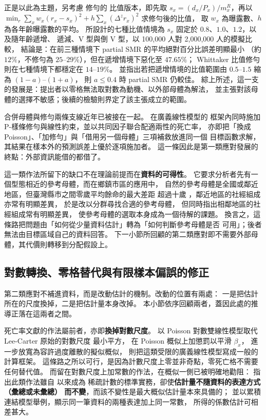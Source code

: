 \documentclass[UTF8, fontset=macnew, a4paper, 12pt]{ctexart}
\begin{document}
\citet{yue2019} 正是以此為主題，另考慮 \citet{whittaker1923} 修勻的
比值版本，即先取 $s_x=(d_x/P_x)/m^R_x$，再以
$\min_r \sum_x w_x(r_x-s_x)^2+h\sum_x(\Delta^z r_x)^2$ 求修勻後的比值，
取 $w_x$ 為曝露數、$h$ 為各年齡曝露數的平均。
所設計的七種比值情境為 $s_x$ 固定於 $0.8$、$1.0$、$1.2$，以及隨年齡遞增、
遞減、V 型與倒 V 型，以 100,000 人對 2,000,000 人的模擬比較，
結論是：在前三種情境下 partial SMR 的平均絕對百分比誤差明顯最小
（約 $12\%$，不修勻為 $25$--$29\%$），但在遞增情境下惡化至 $47.65\%$；
Whittaker 比值修勻則在七種情境下都穩定在 $14$--$19\%$。
並指出若把遞增情境的比值範圍由 $0.5$--$1.5$ 縮為 $(1-a)$--$(1+a)$，
則 $a\le 0.4$ 時 partial SMR 仍較佳。
綜上所述，這一支的發展是：提出者以零格無法取對數為動機、以外部母體為解法，
並主張對該母體的選擇不敏感；後續的檢驗則界定了該主張成立的範圍。

合併母體與修勻兩條支線近年已被接在一起。\citet{pitt2018} 在廣義線性模型的
框架內同時施加 P-樣條修勻與線性約束，並以共同因子聯合配適兩性的死亡率，
亦即把「換成 Poisson」、「加修勻」與「借用另一個母體」三項補救放進同一個
目標函數求解，其結果在樣本外的預測誤差上優於逐項施加者。
這一條因此是第一類應對發展的終點：外部資訊能借的都借了。

這一類作法所留下的缺口不在理論前提而在\textbf{資料的可得性}。
它要求分析者先有一個型態相近的參考母體，而在鄉鎮市區的應用中，
自然的參考母體是全國或鄰近地區，但臺灣縣市之間零歲平均餘命的最大差距
超過十歲 \citep{yue2019}，鄰近地區的社經組成亦常有明顯差異，
\citet{wangyue2026} 於是改以分群尋找合適的參考母體，
但同時指出相鄰地區的社經組成常有明顯差異，
使參考母體的選取本身成為一個待解的課題。
換言之，這條路把問題由「如何從少量資料估計」轉為「如何判斷參考母體是否
可用」；後者無法由目標區域自己的資料回答。
下一小節所回顧的第二類應對即不需要外部母體，其代價則轉移到分配假設上。

\subsection{對數轉換、零格替代與有限樣本偏誤的修正}\label{sec:logzero}\label{sec:biasred}

第二類應對不補進資料，而是改動估計的機制。改動的位置有兩處：
一是把估計所在的尺度換掉，二是把估計量本身改掉。
本小節依序回顧兩者，蓋因此處的推導正落在這兩者之間。

死亡率文獻的作法屬前者，亦即\textbf{換掉對數尺度}。
\citet{brouhns2002} 以 Poisson 對數雙線性模型取代 Lee-Carter 原始的對數尺度
最小平方，\citet{delwarde2007} 在 Poisson 概似上加懲罰以平滑 $\beta_x$，
\citet{djeundje2010} 進一步放寬為容許過度離散的擬似概似，
\citet{currie2013} 則把這類受限的廣義線性模型寫成一般的計算框架。
這條路之所以可行，是因為計數尺度上零並非奇點，零死亡格不需要任何替代值。
而留在對數尺度上加常數的作法，在概似一側已被明確地勸阻：
\citet[\S6.2]{kosmidis2014} 指出此類作法雖自 \citet{haldane1956} 以來成為
稀疏計數的標準實務，卻使\textbf{估計量不隨資料的表達方式（彙總或未彙總）
而不變}，而該不變性是最大概似估計量本來具備的；
並以累積連結模型舉例，顯示同一筆資料的兩種表達加上同一常數，
所得的係數估計可相差甚大。
\end{document}
